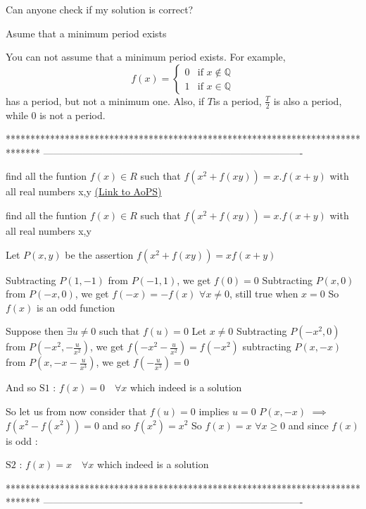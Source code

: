 \begin{solution}
	Can anyone check if my solution is correct?
\end{solution}



\begin{solution}
	\begin{tcolorbox}Asume that a minimum period exists\end{tcolorbox}
You can not assume that a minimum period exists. For example, $$f(x)= \begin{cases} 0 & \text{if } x \notin \mathbb{Q} \\ 1 &\text{if } x \in \mathbb{Q} \end{cases} $$
has a period, but not a minimum one. Also, if $T$is a period, $\frac{T}{2}$ is also a period, while 0 is not a period.
\end{solution}
*******************************************************************************
-------------------------------------------------------------------------------

\begin{problem}
	find all the funtion $ f(x) \in R $ such that $ f(x^2 + f(xy))= x. f(x+y) $ with all real numbers x,y
	\flushright \href{https://artofproblemsolving.com/community/c6h1602769}{(Link to AoPS)}
\end{problem}



\begin{solution}
	\begin{tcolorbox}find all the funtion $ f(x) \in R $ such that $ f(x^2 + f(xy))= x. f(x+y) $ with all real numbers x,y\end{tcolorbox}
Let $P(x,y)$ be the assertion $f(x^2+f(xy))=xf(x+y)$

Subtracting $P(1,-1)$ from $P(-1,1)$, we get $f(0)=0$
Subtracting $P(x,0)$ from $P(-x,0)$, we get $f(-x)=-f(x)$ $\forall x\ne 0$, still true when $x=0$
So $f(x)$ is an odd function

Suppose then $\exists u\ne 0$ such that $f(u)=0$
Let $x\ne 0$
Subtracting $P(-x^2,0)$ from $P(-x^2,-\frac u{x^2})$, we get $f(-x^2-\frac u{x^2})=f(-x^2)$
subtracting $P(x,-x)$ from $P(x,-x-\frac u{x^3})$, we get $f(-\frac u{x^3})=0$

And so $\boxed{\text{S1 : }f(x)=0\quad\forall x}$ which indeed is a solution

So let us from now consider that $f(u)=0$ implies $u=0$
$P(x,-x)$ $\implies$ $f(x^2-f(x^2))=0$ and so $f(x^2)=x^2$
So $f(x)=x$ $\forall x\ge 0$ and since $f(x)$ is odd :

$\boxed{\text{S2 : }f(x)=x\quad\forall x}$ which indeed is a solution

\end{solution}
*******************************************************************************
-------------------------------------------------------------------------------

